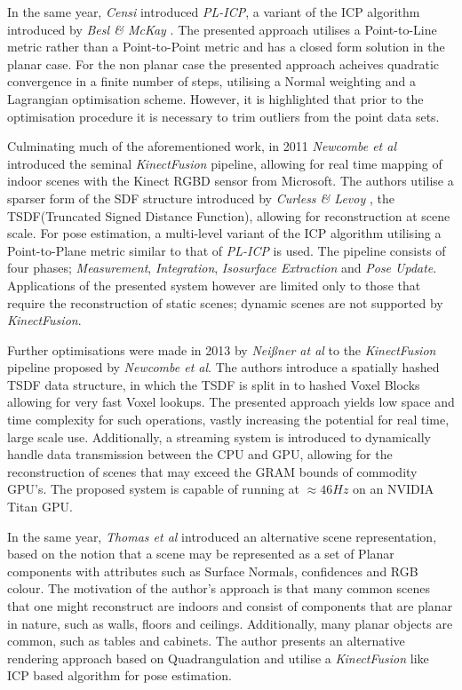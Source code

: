 In the same year, \textit{Censi} \cite{Censi2008} introduced \textit{PL-ICP}, a 
variant of the ICP algorithm introduced by \textit{Besl \& McKay} \cite{Besl1992}. 
The presented approach utilises a Point-to-Line metric rather than a Point-to-Point 
metric and has a closed form solution in the planar case. For the non planar case 
the presented approach acheives quadratic convergence in a finite number of steps, 
utilising a Normal weighting and a Lagrangian optimisation scheme. However, it is 
highlighted that prior to the optimisation procedure it is necessary to trim outliers 
from the point data sets.

Culminating much of the aforementioned work, in 2011 \textit{Newcombe et al} introduced 
the seminal \textit{KinectFusion} pipeline, allowing for real time mapping of indoor 
scenes with the Kinect RGBD sensor from Microsoft. The authors utilise a sparser form 
of the SDF structure introduced by \textit{Curless \& Levoy} \cite{Curless1996}, the 
TSDF(Truncated Signed Distance Function), allowing for reconstruction at scene scale. 
For pose estimation, a multi-level variant of the ICP algorithm utilising a Point-to-Plane 
metric similar to that of \textit{PL-ICP} \cite{Censi2008} is used. The pipeline consists 
of four phases; \textit{Measurement}, \textit{Integration}, \textit{Isosurface Extraction} 
and \textit{Pose Update}. Applications of the presented system however are limited only to 
those that require the reconstruction of static scenes; dynamic scenes are not supported 
by \textit{KinectFusion}.

Further optimisations were made in 2013 by \textit{Nei{\ss}ner at al} to the \textit{KinectFusion} 
pipeline proposed by \textit{Newcombe et al}. The authors introduce a spatially hashed TSDF data 
structure, in which the TSDF is split in to hashed Voxel Blocks allowing for very fast Voxel 
lookups. The presented approach yields low space and time complexity for such operations, vastly 
increasing the potential for real time, large scale use. Additionally, a streaming system is 
introduced to dynamically handle data transmission between the CPU and GPU, allowing for the 
reconstruction of scenes that may exceed the GRAM bounds of commodity GPU's. The proposed 
system is capable of running at $\approx46Hz$ on an NVIDIA Titan GPU.

In the same year, \textit{Thomas et al} \cite{Thomas2013} introduced an alternative scene 
representation, based on the notion that a scene may be represented as a set of Planar 
components with attributes such as Surface Normals, confidences and RGB colour. The motivation 
of the author's approach is that many common scenes that one might reconstruct are indoors and 
consist of components that are planar in nature, such as walls, floors and ceilings. Additionally, 
many planar objects are common, such as tables and cabinets. The author presents an alternative 
rendering approach based on Quadrangulation \cite{QUAD} and utilise a \textit{KinectFusion} 
\cite{Newcombe2011} like ICP based algorithm for pose estimation.

